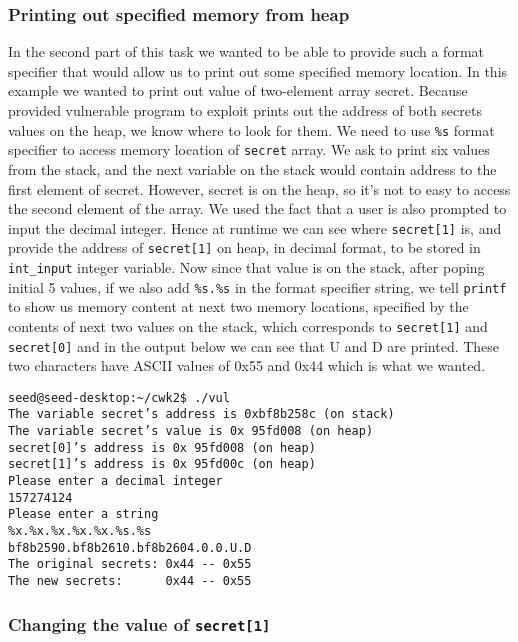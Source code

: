 \documentclass[12pt, a4paper, pdflatex]{article}
\begin{document}
\subsubsection{Printing out specified memory from heap}
In the second part of this task we wanted to be able to provide such a format specifier that would allow us to print out some specified memory location. In this example we wanted to print out value of two-element array secret. Because provided vulnerable program to exploit prints out the address of both secrets values on the heap, we know where to look for them. We need to use \texttt{\%s} format specifier to access memory location of 
\texttt{secret} array. We ask to print six values from the stack, and the next variable on the stack would contain address to the first element of secret. However, secret is on the heap, so it's not to easy to access the second element of the array. We used the fact that a user is also prompted to input the decimal integer. Hence at runtime we can see where \texttt{secret[1]} is, and provide the address of \texttt{secret[1]} on heap, in decimal format, to be stored in \texttt{int\_input} integer variable. Now since that value is on the stack, after poping initial 5 values, if we also add \texttt{\%s.\%s} in the format specifier string, we tell \texttt{printf} to show us memory content at next two memory locations, specified by the contents of next two values on the stack, which corresponds to \texttt{secret[1]} and \texttt{secret[0]} and in the output below we can see that U and D are printed. These two characters have ASCII values of 0x55 and 0x44 which is what we wanted.

\vspace{1em}
\lstset{
	captionpos=b,
	frame=single,
	language=BASH,
	caption=Example of printing out memory,
	label=printf:crash
}
\begin{lstlisting}
seed@seed-desktop:~/cwk2$ ./vul
The variable secret’s address is 0xbf8b258c (on stack)
The variable secret’s value is 0x 95fd008 (on heap)
secret[0]’s address is 0x 95fd008 (on heap)
secret[1]’s address is 0x 95fd00c (on heap)
Please enter a decimal integer
157274124
Please enter a string
%x.%x.%x.%x.%x.%s.%s   
bf8b2590.bf8b2610.bf8b2604.0.0.U.D
The original secrets: 0x44 -- 0x55
The new secrets:      0x44 -- 0x55
\end{lstlisting}

\subsubsection{Changing the value of \texttt{secret[1]}}
\end{document}
